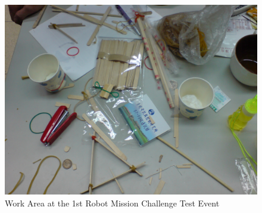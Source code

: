 \documentclass[12pt]{hurocup}
\begin{document}
\begin{figure}
\begin{center}
\includegraphics[width=0.8\linewidth]{Figures/junkyard_challenge_table}
\caption{Work Area at the 1st Robot Mission Challenge Test Event}
\label{fig:work-area}
\end{center}
\end{figure}
\end{document}
